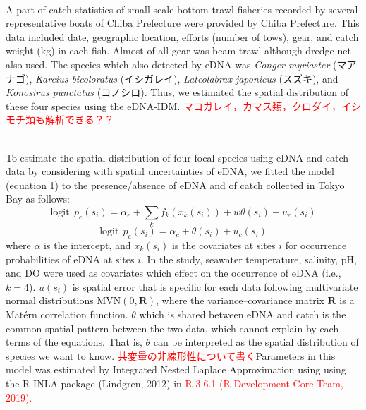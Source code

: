 \documentclass[12pt]{article}
\begin{document}
\begin{linenumbers}
\\
A part of catch statistics of small-scale bottom trawl fisheries recorded by several representative boats of Chiba Prefecture were provided by Chiba Prefecture. This data included date, geographic location, efforts (number of tows), gear, and catch weight (kg) in each fish. Almost of all gear was beam trawl although dredge net also used. The species which also detected by eDNA was \textit{Conger myriaster} (マアナゴ), \textit{Kareius bicoloratus} (イシガレイ), \textit{Lateolabrax japonicus} (スズキ), and \textit{Konosirus punctatus} (コノシロ). Thus, we estimated the spatial distribution of these four species using the eDNA-IDM. \textcolor{red}{マコガレイ，カマス類，クロダイ，イシモチ類も解析できる？？}

\\
To estimate the spatial distribution of four focal species using eDNA and catch data by considering with spatial  uncertainties of eDNA, we fitted the model (equation 1) to the presence/absence of eDNA and of catch collected in Tokyo Bay as follows:
\[
\mathrm{logit} \ \ p_{e}(s_{i}) = \alpha_{e} + \sum_{k}f_{k}(x_{k}(s_{i})) + w \theta(s_{i}) + u_{e}(s_{i})
\]
\[
\mathrm{logit} \ \ p_{c}(s_{i}) = \alpha_{c} + \theta(s_{i}) + u_{c}(s_{i})
\]
where $\alpha$ is the intercept, and $x_{k}(s_{i})$ is the covariates at sites $i$ for occurrence probabilities of eDNA at sites $i$. In the study, seawater temperature, salinity, pH, and DO were used as covariates which effect on the occurrence of eDNA (i.e., $k = 4$). $u(s_{i})$ is spatial error that is specific for each data following multivariate normal distributions $\mathrm{MVN}(0, \mathbf{R})$, where the variance--covariance matrix $\mathbf{R}$ is a Mat\'{e}rn correlation function. $\theta$ which is shared between eDNA and catch is the common spatial pattern between the two data, which cannot explain by each terms of the equations. That is, $\theta$ can be interpreted as the spatial distribution of species we want to know. \textcolor{red}{共変量の非線形性について書く}Parameters in this model was estimated by Integrated Nested Laplace Approximation using using the R-INLA package (Lindgren, 2012) in \textcolor{red}{R 3.6.1 (R Development Core Team, 2019).}
\ \ \ \ \ \ \ \ \ \ 





\end{linenumbers}
\end{document}
